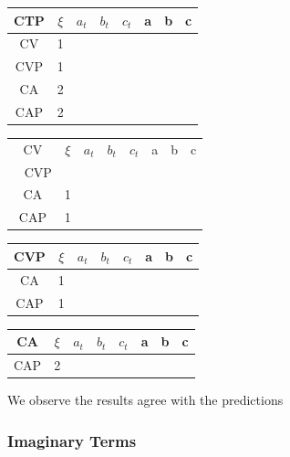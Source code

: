 \documentclass[twocolumn]{article}
\begin{document}
\begin{table}[H]
	\begin{tabular}{|c|c|c|c|c|c|c|c|}
		\hline
		CTP & $\xi $& $a_t$ & $b_t$ & $c_t$ & a & b & c \\
		\hline
		CV & 1 &   &   &   &   &   &   \\
		\hline
		CVP & 1 &   &   &   &   &   &   \\
		\hline
		CA & 2 &   &   &   &   &   &   \\
		\hline
		CAP & 2 &   &   &   &   &   &   \\
		\hline
	\end{tabular}
\end{table}

\begin{table}[H]
	\begin{tabular}{|c|c|c|c|c|c|c|c|}
		\hline
		CV & $\xi $& $a_t$ & $b_t$ & $c_t$ & a & b & c \\\
		\hline
		CVP &   &   &   &   &   &   &   \\
		\hline
		CA & 1 &   &   &   &   &   &   \\
		\hline
		CAP & 1 &   &   &   &   &   &   \\
		\hline
	\end{tabular}
\end{table}


\begin{table}[H]
	\begin{tabular}{|c|c|c|c|c|c|c|c|}
		\hline
		CVP & $\xi $& $a_t$ & $b_t$ & $c_t$ & a & b & c \\
		\hline
		CA & 1 &   &   &   &   &   &   \\
		\hline
		CAP & 1 &   &   &   &   &   &   \\
		\hline
	\end{tabular}
\end{table}

\begin{table}[H]
	\begin{tabular}{|c|c|c|c|c|c|c|c|}
		\hline
		CA & $\xi $& $a_t$ & $b_t$ & $c_t$ & a & b & c \\
		\hline
		CAP & 2 &   &   &   &   &   &   \\
		\hline
	\end{tabular}
\end{table}

We observe the results agree with the predictions

\subsubsection{Imaginary Terms}
\end{document}
